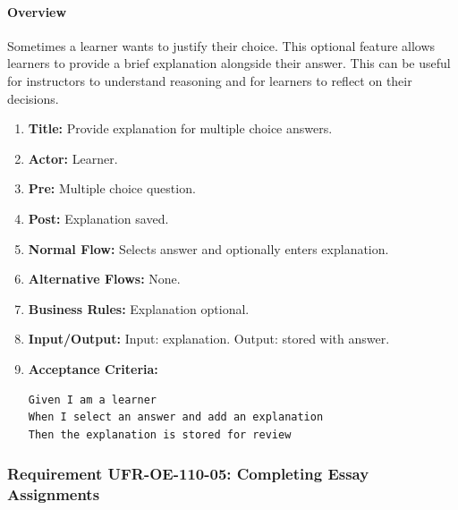 \paragraph{Overview}
Sometimes a learner wants to justify their choice. This optional feature allows learners to provide a brief explanation alongside their answer. This can be useful for instructors to understand reasoning and for learners to reflect on their decisions.
\begin{enumerate}[label=\textbf{\arabic*.}]
\item \textbf{Title:} Provide explanation for multiple choice answers.
\item \textbf{Actor:} Learner.
\item \textbf{Pre:} Multiple choice question.
\item \textbf{Post:} Explanation saved.
\item \textbf{Normal Flow:} Selects answer and optionally enters explanation.
\item \textbf{Alternative Flows:} None.
\item \textbf{Business Rules:} Explanation optional.
\item \textbf{Input/Output:} Input: explanation. Output: stored with answer.
\item \textbf{Acceptance Criteria:}
    \begin{verbatim}
Given I am a learner
When I select an answer and add an explanation
Then the explanation is stored for review
    \end{verbatim}
\end{enumerate}

\subsubsection{Requirement UFR-OE-110-05: Completing Essay Assignments}
